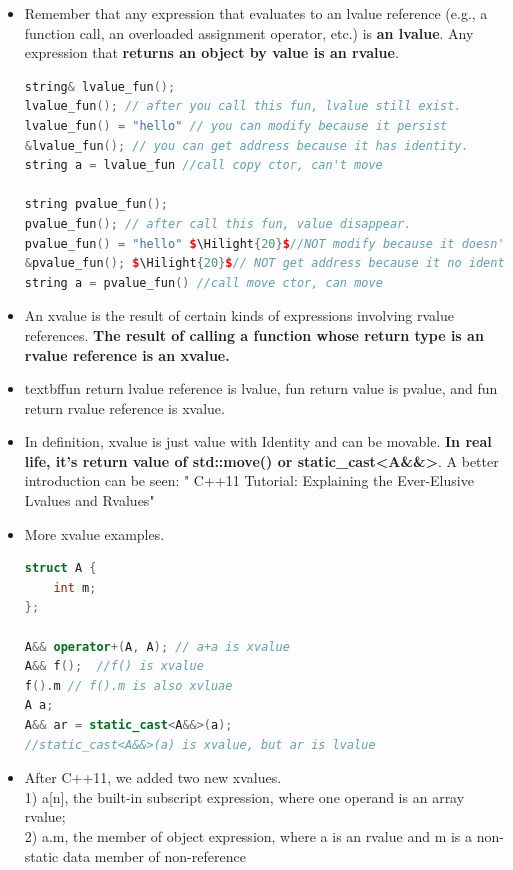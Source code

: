 \documentclass[a4paper,11pt,twoside]{book}
\newcommand{\Hilight}[1]{\makebox[0pt][l]{\color{yellow}\rule[-3pt]{#1em}{11pt}}}
\newcommand{\Hilight}[1]{}
\begin{document}
\begin{itemize}
	\item Remember that any expression that evaluates to an lvalue reference (e.g., a function call, an overloaded assignment operator, etc.) is \textbf{an lvalue}. Any expression that \textbf{returns an object by value is an rvalue}.
	
\begin{lstlisting}[frame=single, language=c++, mathescape=true]
string& lvalue_fun();
lvalue_fun(); // after you call this fun, lvalue still exist.
lvalue_fun() = "hello" // you can modify because it persist
&lvalue_fun(); // you can get address because it has identity.
string a = lvalue_fun //call copy ctor, can't move

string pvalue_fun();
pvalue_fun(); // after call this fun, value disappear.
pvalue_fun() = "hello" $\Hilight{20}$//NOT modify because it doesn't persist
&pvalue_fun(); $\Hilight{20}$// NOT get address because it no identity.
string a = pvalue_fun() //call move ctor, can move
\end{lstlisting}
	
	\item An xvalue is the result of certain kinds of expressions involving rvalue references. \textbf{The result of calling a function whose return type is an rvalue reference is an xvalue.}
	
	\item textbf{fun return lvalue reference is lvalue, fun return value is pvalue, and fun return rvalue reference is xvalue.}
	
	\item In definition,  xvalue is just value with Identity and can be movable. \textbf{In real life, it's  return value of std::move() or static\_cast<A\&\&>}. A better introduction can be seen: " C++11 Tutorial: Explaining the Ever-Elusive Lvalues and Rvalues"
	
	\item More xvalue examples.
\begin{lstlisting}[frame=single, language=c++, mathescape=true]
struct A {
	int m;
};
	
A&& operator+(A, A); // a+a is xvalue
A&& f();  //f() is xvalue
f().m // f().m is also xvluae
A a;
A&& ar = static_cast<A&&>(a);
//static_cast<A&&>(a) is xvalue, but ar is lvalue
\end{lstlisting}
	
	\item After C++11, we added two new xvalues.\\
	1) a[n], the built-in subscript expression, where one operand is an array rvalue;\\
	2) a.m, the member of object expression, where a is an rvalue and m is a non-static data member of non-reference
\end{itemize}
\end{document}
